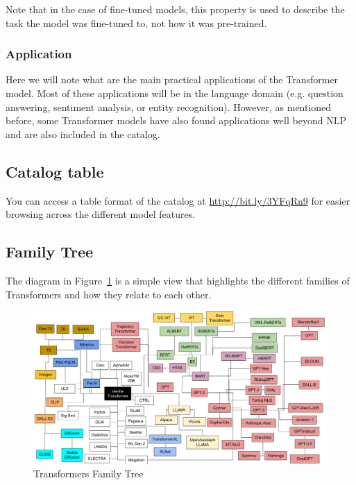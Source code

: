 \documentclass{article}
\begin{document}
Note that in the case of fine-tuned models, this property is used to describe the task the model was fine-tuned to, not how it was pre-trained.

\subsubsection{Application}

Here we will note what are the main practical applications of the Transformer model. Most of these applications will be in the language domain (e.g. question answering, sentiment analysis, or entity recognition). However, as mentioned before, some Transformer models have also found applications well beyond NLP and are also included in the catalog.

\subsection{Catalog table}

You can access a table format of the catalog at \protect\url{http://bit.ly/3YFqRn9} for easier browsing across the different model features.

\subsection{Family Tree}

The diagram in Figure~\ref{fig:tree} is a simple view that highlights the different families of Transformers and how they relate to each other.

\begin{figure}
    \centering
    \includegraphics[width=\textwidth,height=\textheight,keepaspectratio]{02-05.png}
    \caption{Transformers Family Tree}
    \label{fig:tree}
\end{figure}
\end{document}
